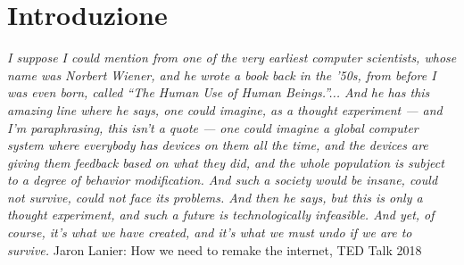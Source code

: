 \section{Introduzione}
\label{sec:Introduzione}

\begin{center}
\vspace{0.5cm}
\textit{I suppose I could mention from one of the very earliest computer scientists,
whose name was Norbert Wiener, and he wrote a book back in the ’50s,
from before I was even born, called “The Human Use of Human Beings.”...
And he has this amazing line where he says, one could imagine, as a thought experiment
— and I’m paraphrasing, this isn’t a quote —
one could imagine a global computer system where everybody has devices on them all the time,
and the devices are giving them feedback based on what they did,
and the whole population is subject to a degree of behavior modification.
And such a society would be insane, could not survive, could not face its problems.
And then he says, but this is only a thought experiment,
and such a future is technologically infeasible.
And yet, of course, it’s what we have created,
and it’s what we must undo if we are to survive.}
\vspace{0.5cm}
Jaron Lanier: How we need to remake the internet, TED Talk 2018
\vspace{0.5cm}
\end{center}

